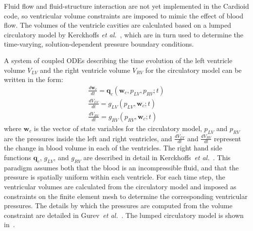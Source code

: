 Fluid flow and fluid-structure interaction are not yet implemented in the Cardioid code, so ventricular volume constraints are imposed to mimic the effect of blood flow. The volumes of the ventricle cavities are calculated based on a lumped circulatory model by Kerckhoffs \textit{et al.}~\cite{kerckhoffs_2006}, which are in turn used to determine the time-varying, solution-dependent pressure boundary conditions.

A system of coupled ODEs describing the time evolution of the left ventricle volume $V_{LV}$ and the right ventricle volume $V_{RV}$ for the circulatory model can be written in the form:
\begin{align}
\frac{d\bm{w}_{c}}{dt} = \bm{q}_c(\bm{w}_c, p_{LV}, p_{RV}; t) \\
\frac{dV_{LV}}{dt} = g_{LV}(p_{LV}, \bm{w}_c; t) \\
\frac{dV_{RV}}{dt} = g_{RV}(p_{RV}, \bm{w}_c; t)
\end{align}
where $\bm{w}_c$ is the vector of state variables for the circulatory model, $p_{LV}$ and $p_{RV}$ are the pressures inside the left and right ventricles, and $\frac{dV_{LV}}{dt}$ and $\frac{dV_{RV}}{dt}$ represent the change in blood volume in each of the ventricles. The right hand side functions $\bm{q}_c$, $g_{LV}$, and $g_{RV}$ are described in detail in Kerckhoffs~\textit{et al.}~\cite{kerckhoffs_2006}. This paradigm assumes both that the blood is an incompressible fluid, and that the pressure is spatially uniform within each ventricle. For each time step, the ventricular volumes are calculated from the circulatory model and imposed as constraints on the finite element mesh to determine the corresponding ventricular pressures. The details by which the pressures are computed from the volume constraint are detailed in Gurev~\textit{et al.}~\cite{gurev_2015}. The lumped circulatory model is shown in~.
